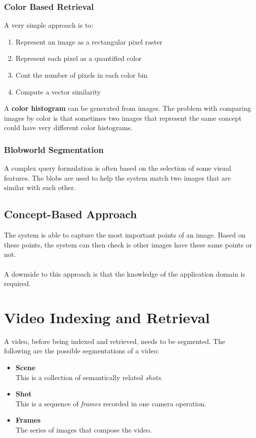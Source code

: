 \documentclass{article}
\begin{document}
\subsubsection{Color Based Retrieval}
A very simple approach is to:

\begin{enumerate}
	\item Represent an image as a rectangular pixel raster
	\item Represent each pixel as a quantified color
	\item Cont the number of pixels in each color bin
	\item Compute a vector similarity
\end{enumerate}
A \textbf{color histogram} can be generated from images. The problem with comparing images by color is that sometimes two images that represent the same concept could have very different color histograms.

\subsubsection{Blobworld Segmentation}
A complex query formulation is often based on the selection of some visual features. The blobs are used to help the system match two images that are similar with each other.

\subsection{Concept-Based Approach}
The system is able to capture the most important points of an image. Based on these points, the system can then check is other images have these same points or not. \\ \\
A downside to this approach is that the knowledge of the application domain is required.

\section{Video Indexing and Retrieval}
A video, before being indexed and retrieved, needs to be segmented. The following are the possible segmentations of a video:

\begin{itemize}
 \item \textbf{Scene}
 \vspace{.2cm} \\
 This is a collection of semantically related \textit{shots}.
 
 \item \textbf{Shot}
 \vspace{.2cm} \\
 This is a sequence of \textit{frames} recorded in one camera operation.
 
 \item \textbf{Frames}
 \vspace{.2cm} \\
 The series of images that compose the video.
\end{itemize}
\end{document}
